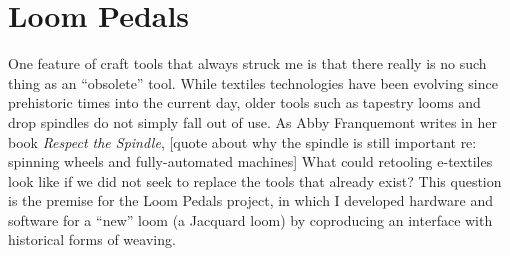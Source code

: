 \chapter{Loom Pedals}
\label{ch_loom-pedals}


One feature of craft tools that always struck me is that there really is no such thing as an ``obsolete'' tool. While textiles technologies have been evolving since prehistoric times into the current day, older tools such as tapestry looms and drop spindles do not simply fall out of use. As Abby Franquemont writes in her book \textit{Respect the Spindle}, [quote about why the spindle is still important re: spinning wheels and fully-automated machines] What could retooling e-textiles look like if we did not seek to replace the tools that already exist? This question is the premise for the Loom Pedals project, in which I developed hardware and software for a ``new'' loom (a Jacquard loom) by coproducing an interface with historical forms of weaving.



